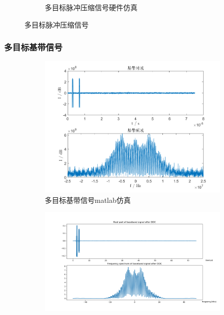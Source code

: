 \documentclass{article}
\newcounter{sub}
\begin{document}
\begin{figure}[H]
\begin{subfigure}[H]{.45\linewidth}
		\caption{多目标脉冲压缩信号硬件仿真}
		\label{fig:多目标脉冲压缩信号硬件仿真}
	\end{subfigure}
	\caption{多目标脉冲压缩信号}
	\label{fig:多目标脉冲压缩信号}
\end{figure}

\subsubsection{多目标基带信号}%
\label{ssub:多目标基带信号}

\begin{figure}[H]
	\centering
	\begin{subfigure}[H]{.45\linewidth}
		\centering
		\includegraphics[width=\linewidth]{two-baseband-matlab.png}
		\caption{多目标基带信号matlab仿真}
		\label{fig:多目标基带信号matlab仿真}
	\end{subfigure}
	\quad
	\begin{subfigure}[H]{.45\linewidth}
		\centering
		\includegraphics[width=\linewidth]{two-baseband-software.png}

\end{subfigure}
\end{figure}
\end{document}
